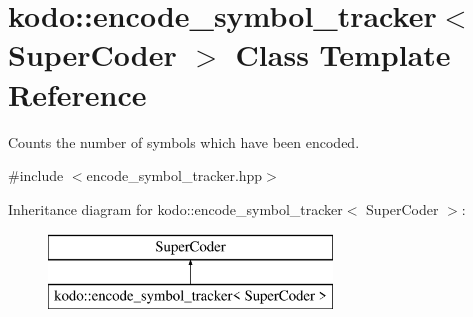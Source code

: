 \hypertarget{classkodo_1_1encode__symbol__tracker}{\section{kodo\-:\-:encode\-\_\-symbol\-\_\-tracker$<$ Super\-Coder $>$ Class Template Reference}
\label{classkodo_1_1encode__symbol__tracker}
}


Counts the number of symbols which have been encoded.  




{\ttfamily \#include $<$encode\-\_\-symbol\-\_\-tracker.\-hpp$>$}

Inheritance diagram for kodo\-:\-:encode\-\_\-symbol\-\_\-tracker$<$ Super\-Coder $>$\-:\begin{figure}[H]
\begin{center}
\leavevmode
\includegraphics[height=2.000000cm]{classkodo_1_1encode__symbol__tracker}
\end{center}
\end{figure}
